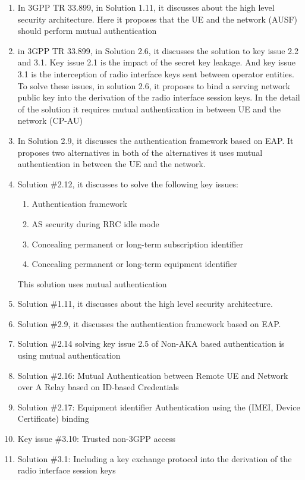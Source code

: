 \documentclass[lnicst,sechang,a4paper]{svmultln}
\begin{document}
\begin{enumerate}
\item In 3GPP TR 33.899, in Solution 1.11, it discusses about the high level security architecture. Here it proposes that the UE and the network (AUSF) should perform mutual authentication
\item in 3GPP TR 33.899, in Solution 2.6, it discusses the solution to key issue 2.2 and 3.1. Key issue 2.1 is the impact of the secret key leakage. And key issue 3.1 is the interception of radio interface keys sent between operator entities. To solve these issues, in solution 2.6, it proposes to bind a serving network public key into the derivation of the radio interface session keys. In the detail of the solution it requires mutual authentication in between UE and the network (CP-AU)
\item In Solution 2.9, it discusses the authentication framework based on EAP. It proposes two alternatives in both of the alternatives it uses mutual authentication in between the UE and the network.
\item Solution \#2.12, it discusses to solve the following key issues:
\begin{enumerate}
\item Authentication framework
\item AS security during RRC idle mode
\item Concealing permanent or long-term subscription identifier
\item Concealing permanent or long-term equipment identifier
\end{enumerate}
This solution uses mutual authentication 
\item Solution \#1.11, it discusses about the high level security architecture.
\item Solution \#2.9, it discusses the authentication framework based on EAP.
\item Solution \#2.14 solving key issue 2.5 of Non-AKA based authentication is using mutual authentication
\item Solution \#2.16: Mutual Authentication between Remote UE and Network over A Relay based on ID-based Credentials
\item Solution \#2.17: Equipment identifier Authentication using the (IMEI, Device Certificate) binding
\item Key issue \#3.10: Trusted non-3GPP access
\item Solution \#3.1: Including a key exchange protocol into the derivation of the radio interface session keys

\end{enumerate}
\end{document}

